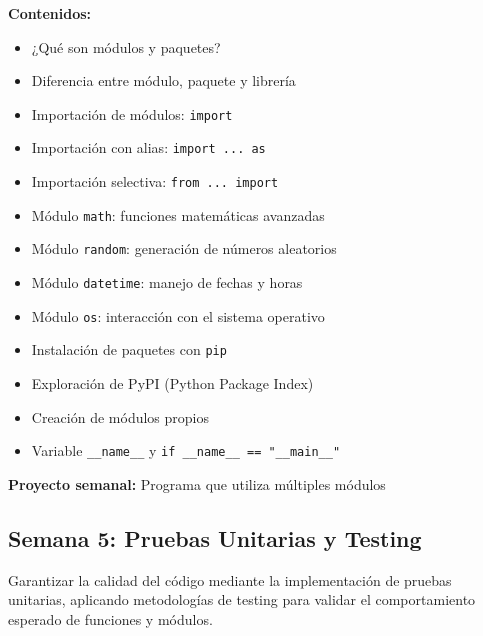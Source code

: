 \documentclass[12pt,letterpaper]{article}
\begin{document}
\textbf{Contenidos:}
\begin{itemize}[leftmargin=*]
    \item ¿Qué son módulos y paquetes?
    \item Diferencia entre módulo, paquete y librería
    \item Importación de módulos: \texttt{import}
    \item Importación con alias: \texttt{import ... as}
    \item Importación selectiva: \texttt{from ... import}
    \item Módulo \texttt{math}: funciones matemáticas avanzadas
    \item Módulo \texttt{random}: generación de números aleatorios
    \item Módulo \texttt{datetime}: manejo de fechas y horas
    \item Módulo \texttt{os}: interacción con el sistema operativo
    \item Instalación de paquetes con \texttt{pip}
    \item Exploración de PyPI (Python Package Index)
    \item Creación de módulos propios
    \item Variable \texttt{\_\_name\_\_} y \texttt{if \_\_name\_\_ == "\_\_main\_\_"}
\end{itemize}

\textbf{Proyecto semanal:} Programa que utiliza múltiples módulos

\subsection{Semana 5: Pruebas Unitarias y Testing}

\begin{objetivobox}
Garantizar la calidad del código mediante la implementación de pruebas unitarias, aplicando metodologías de testing para validar el comportamiento esperado de funciones y módulos.
\end{objetivobox}
\end{document}
